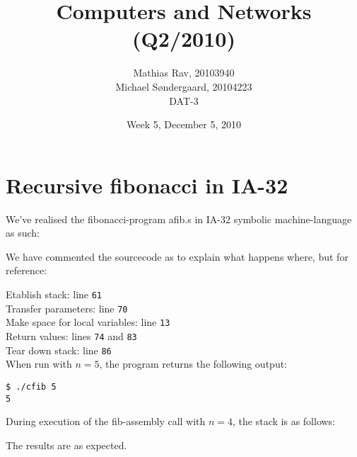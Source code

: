 \documentclass[12pt,a4paper]{article}
\title{Computers and Networks (Q2/2010)}
\author{Mathias Rav, 20103940 \\
		Michael Søndergaard, 20104223 \\
		DAT-3}
\date{Week 5, December 5, 2010}
\begin{document}
\maketitle

\section{Recursive fibonacci in IA-32}
We've realised the fibonacci-program afib.s in IA-32 symbolic machine-language as such:



We have commented the sourcecode as to explain what happens where, but for reference:

Etablish stack: line \texttt{61} \\
Transfer parameters: line \texttt{70} \\
Make space for local variables: line \texttt{13} \\
Return values: lines \texttt{74} and \texttt{83} \\
Tear down stack: line \texttt{86} \\


When run with $n=5$, the program returns the following output:
\lstset{numbers=none}
\begin{lstlisting}
$ ./cfib 5  
5
\end{lstlisting}

During execution of the fib-assembly call with $n=4$, the stack is as follows:


The results are as expected.
\end{document}
